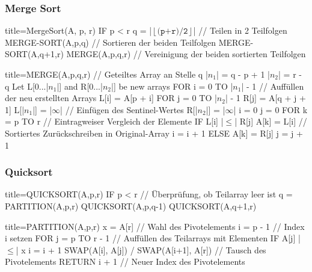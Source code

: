     \subsubsection*{Merge Sort}
        \begin{ccode}[autogobble,escapeinside=||]{title={MergeSort(A, p, r)}}
        IF p < r
            q = |$\left \lfloor \texttt{(p+r)/2} \right \rfloor$| // Teilen in 2 Teilfolgen 
            MERGE-SORT(A,p,q) // Sortieren der beiden Teilfolgen
            MERGE-SORT(A,q+1,r)
            MERGE(A,p,q,r) // Vereinigung der beiden sortierten Teilfolgen
        \end{ccode}
    
        \begin{ccode}[autogobble,escapeinside=||]{title={MERGE(A,p,q,r)}}
        // Geteiltes Array an Stelle q
        |$n_1$| = q - p + 1
        |$n_2$| = r - q 
        Let L[0...|$n_1$|] and R[0...|$n_2$|] be new arrays 
        FOR i = 0 TO |$n_1$| - 1 // Auffüllen der neu erstellten Arrays
            L[i] = A[p + i]
        FOR j = 0 TO |$n_2$| - 1
            R[j] = A[q + j + 1]
        L[|$n_1$|] = |$\infty$| // Einfügen des Sentinel-Wertes
        R[|$n_2$|] = |$\infty$|
        i = 0
        j = 0
        FOR k = p TO r  // Eintragweiser Vergleich der Elemente          
            IF L[i] |$\leq$| R[j]
                A[k] = L[i] // Sortiertes Zurückschreiben in Original-Array
                i = i + 1
            ELSE 
                A[k] = R[j]
                j = j + 1
        \end{ccode}
    
    \subsubsection*{Quicksort}
        \begin{ccode}[autogobble,escapeinside=||]{title={QUICKSORT(A,p,r)}}
        IF p < r    // Überprüfung, ob Teilarray leer ist
            q = PARTITION(A,p,r)
            QUICKSORT(A,p,q-1)
            QUICKSORT(A,q+1,r)
        \end{ccode}
    
        \begin{ccode}[autogobble,escapeinside=||]{title={PARTITION(A,p,r)}}
        x = A[r]    // Wahl des Pivotelements
        i = p - 1   // Index i setzen
        FOR j = p TO r - 1 // Auffüllen des Teilarrays mit Elementen
            IF A[j] |$\leq$| x
                i = i + 1
                SWAP(A[i], A[j]) /
        SWAP(A[i+1], A[r]) // Tausch des Pivotelements
        RETURN i + 1 // Neuer Index des Pivotelements
        \end{ccode}
    
